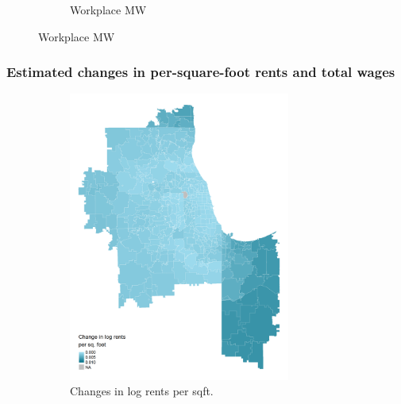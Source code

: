 \documentclass[aspectratio=169, t]{beamer}
\begin{document}
\begin{frame}
\begin{figure}
\begin{subfigure}{0.5\textwidth}
            \caption*{Workplace MW}
        \end{subfigure}
    \end{figure}
\end{frame}

\begin{frame}
    \frametitle{Estimated changes in per-square-foot rents and total wages}

    \vspace{-2mm}

    \begin{figure}
        \begin{subfigure}{0.5\textwidth}
            \includegraphics[width = 0.8\textwidth]{counterfactuals/output/chicago_d_ln_rents.png}
            \caption*{Changes in log rents per sqft.}
        \end{subfigure}%
        \begin{subfigure}{0.5\textwidth}

\end{subfigure}
\end{figure}
\end{frame}
\end{document}
